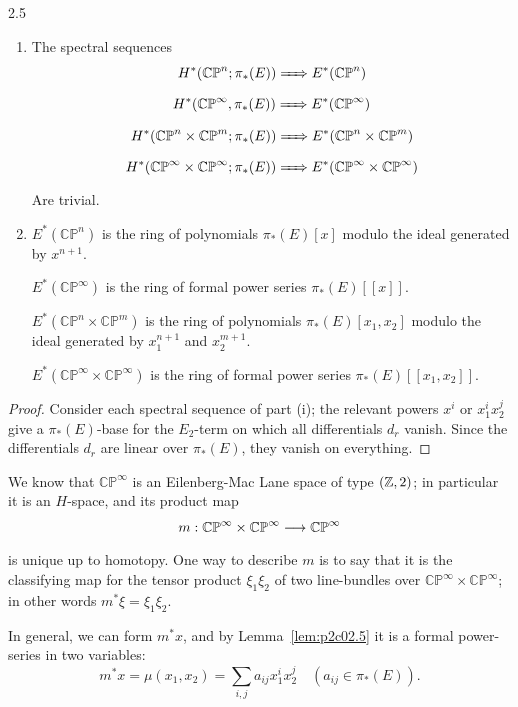 \documentclass[../main]{subfiles}
\begin{document}
\begin{customlemma}{2.5}
\label{lem:p2c02.5}
\begin{enumerate}
    \item[(i)] The spectral sequences \[H^\ast(\mathbb {CP}^n; \pi_\ast(E)) \xRightarrow{\phantom{.....}} E^\ast(\mathbb {CP}^n)\]
    \[H^\ast(\mathbb {CP}^\infty, \pi_\ast(E))  \xRightarrow{\phantom{.....}} E^\ast(\mathbb {CP}^\infty)\]
    \[H^\ast(\mathbb {CP}^n \times \mathbb {CP}^m; \pi_\ast(E))  \xRightarrow{\phantom{.....}} E^\ast(\mathbb {CP}^n \times \mathbb {CP}^m)\]
    \[H^\ast(\mathbb {CP}^\infty \times \mathbb {CP}^\infty; \pi_\ast(E))  \xRightarrow{\phantom{.....}} E^\ast(\mathbb {CP}^\infty \times \mathbb {CP}^\infty)\]
    Are trivial.
    \item[(ii)] $E^\ast(\mathbb {CP}^n)$ is the ring of polynomials $\pi_\ast(E)[x]$ modulo the ideal generated by $x^{n + 1}$.
    
    $E^\ast(\mathbb {CP}^\infty)$ is the ring of formal power series $\pi_\ast(E)[[x]]$.
    
    $E^\ast(\mathbb {CP}^n \times \mathbb {CP}^m)$ is the ring of polynomials $\pi_\ast(E)[x_1, x_2]$ modulo the ideal generated by $x_1^{n + 1}$ and $x_2^{m + 1}$.
    
    $E^\ast(\mathbb {CP}^\infty \times \mathbb {CP}^\infty)$ is the ring of formal power series $\pi_\ast(E)[[x_1, x_2]]$.
\end{enumerate}
\end{customlemma}

\begin{proof}
Consider each spectral sequence of part (i); the relevant powers $x^i$ or $x_1^i x_2^j$ give a $\pi_\ast(E)$-base for the $E_2$-term on which all differentials $d_r$ vanish. Since the differentials $d_r$ are linear over $\pi_\ast(E)$, they vanish on everything.
\end{proof}
We know that $\mathbb {CP}^\infty$ is an Eilenberg-Mac Lane space of type $(\mathbb{Z}, 2)$; in particular it is an $H$-space, and its product map \[m : \mathbb {CP}^\infty \times \mathbb {CP}^\infty \lar{} \mathbb {CP}^\infty\] is unique up to homotopy. One way to describe $m$ is to say that it is the classifying map for the tensor product $\xi_1 \xi_2$ of two line-bundles over $\mathbb {CP}^\infty \times \mathbb {CP}^\infty$; in other words $m^\ast \xi = \xi_1 \xi_2$. 


In general, we can form $m^\ast x$, and by Lemma~\ref{lem:p2c02.5} it is a formal power-series in two variables:
\begin{equation}
\tag{2.6}
\label{eqn:p2c02.6}
m^\ast x = \mu(x_1, x_2) = \sum_{i, j} a_{ij} x_1^i x_2^j \quad (a_{ij} \in \pi_\ast(E)).
\end{equation}
\end{document}

